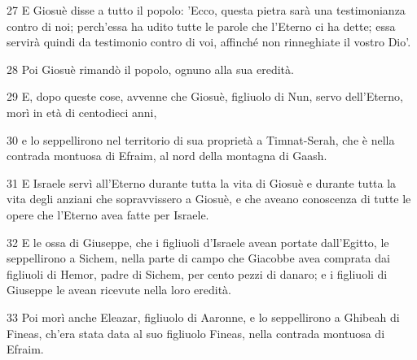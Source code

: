 \par 27 E Giosuè disse a tutto il popolo: 'Ecco, questa pietra sarà una testimonianza contro di noi; perch'essa ha udito tutte le parole che l'Eterno ci ha dette; essa servirà quindi da testimonio contro di voi, affinché non rinneghiate il vostro Dio'.
\par 28 Poi Giosuè rimandò il popolo, ognuno alla sua eredità.
\par 29 E, dopo queste cose, avvenne che Giosuè, figliuolo di Nun, servo dell'Eterno, morì in età di centodieci anni,
\par 30 e lo seppellirono nel territorio di sua proprietà a Timnat-Serah, che è nella contrada montuosa di Efraim, al nord della montagna di Gaash.
\par 31 E Israele servì all'Eterno durante tutta la vita di Giosuè e durante tutta la vita degli anziani che sopravvissero a Giosuè, e che aveano conoscenza di tutte le opere che l'Eterno avea fatte per Israele.
\par 32 E le ossa di Giuseppe, che i figliuoli d'Israele avean portate dall'Egitto, le seppellirono a Sichem, nella parte di campo che Giacobbe avea comprata dai figliuoli di Hemor, padre di Sichem, per cento pezzi di danaro; e i figliuoli di Giuseppe le avean ricevute nella loro eredità.
\par 33 Poi morì anche Eleazar, figliuolo di Aaronne, e lo seppellirono a Ghibeah di Fineas, ch'era stata data al suo figliuolo Fineas, nella contrada montuosa di Efraim.


